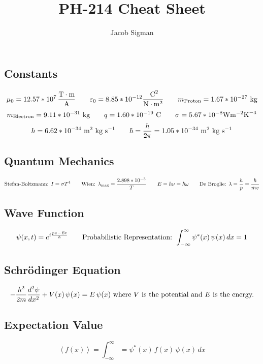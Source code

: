 \documentclass{article}
\title{PH-214 Cheat Sheet}
\author{Jacob Sigman}
\date{}
\begin{document}
\maketitle

\subsection*{Constants}
\[\mu_0=12.57*10^7\,\frac{\textnormal{T}\cdot\textnormal{m}}{\textnormal{A}}\hspace{7 mm}\varepsilon_0=8.85*10^{-12}\frac{\textnormal{ C}^2}{\textnormal{N}\cdot\textnormal{m}^2}\hspace{7 mm}m_{\textnormal{Proton}}=1.67*10^{-27}\textnormal{ kg}\]
\[m_{\textnormal{Electron}}=9.11*10^{-31}\textnormal{ kg}\hspace{7 mm}q=1.60*10^{-19} \textnormal{ C}\hspace{7 mm}\sigma=5.67*10^{-8}\textnormal{W}\textnormal{m}^{-2}\textnormal{K}^{-4}\]
\[h=6.62*10^{-34}\textnormal{ m}^2\textnormal{ kg}\textnormal{ s}^{-1}\hspace{7 mm}\hbar=\frac{h}{2\pi}=1.05*10^{-34}\textnormal{ m}^2\textnormal{ kg}\textnormal{ s}^{-1}\]
\subsection*{Quantum Mechanics}
\[\textnormal{Stefan-Boltzmann: }I=\sigma T^4\hspace{7 mm}\textnormal{Wien: }\lambda_{\textnormal{max}}=\frac{2.898*10^{-3}}{T}\hspace{7 mm}E=h\nu=\hbar\omega\hspace{7 mm}\textnormal{De Broglie: }\lambda=\frac{h}{p}=\frac{h}{mv}\]
\subsection*{Wave Function}
\[\psi(x,t)=e^{i\frac{px-Et}{\hbar}}\hspace{7 mm}\textnormal{Probabilistic Representation: }\int_{-\infty}^\infty\psi^{*}(x)\,\psi(x)\,dx=1\]
\subsection*{Schrödinger Equation}
\[-\frac{\hbar^2}{2m}\frac{d^2\psi}{dx^2}+V(x)\,\psi(x)=E\,\psi(x)\textnormal{ where }V\textnormal{ is the potential and }E\textnormal{ is the energy.}\]
\subsection*{Expectation Value}
\[\left<f(x)\right>=\int_{-\infty}^\infty=\psi^{*}(x)\,f(x)\,\psi(x)\,dx\]
\end{document}
